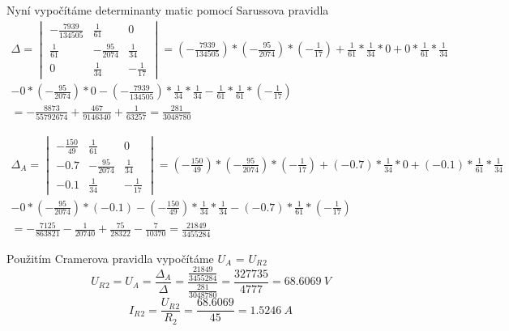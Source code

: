 Nyní vypočítáme determinanty matic pomocí Sarussova pravidla
\begin{multline*}
    \Delta =
    \begin{vmatrix}
        -\frac {7939} {134505}  & \frac {1} {61}        & 0 \\[6pt]
        \frac {1} {61}          & -\frac {95} {2074}    & \frac {1} {34} \\[6pt]
        0                       & \frac {1} {34}        & -\frac {1} {17}
    \end{vmatrix}
    = (-\frac {7939} {134505}) * (-\frac {95} {2074}) * (-\frac {1} {17}) 
    + \frac {1} {61} * \frac {1} {34} * 0
    + 0 * \frac {1} {61} * \frac {1} {34} \\
    - 0 * (-\frac {95} {2074}) * 0
    - (-\frac {7939} {134505}) * \frac {1} {34} * \frac {1} {34}
    - \frac {1} {61} * \frac {1} {61} * (-\frac {1} {17}) \\
    = -\frac {8873} {55792674} + \frac {467} {9146340} + \frac {1} {63257}
    = \frac {281} {3048780}
\end{multline*}

\begin{multline*}
    \Delta_A =
    \begin{vmatrix}
        -\frac {150} {49}       & \frac {1} {61}       & 0 \\[6pt]
        -0.7                    & -\frac {95} {2074}    & \frac {1} {34} \\[6pt]
        -0.1                    & \frac {1} {34}        & -\frac {1} {17}
    \end{vmatrix}
    = (-\frac {150} {49}) * (-\frac {95} {2074}) * (-\frac {1} {17}) 
    + (-0.7) * \frac {1} {34} * 0
    + (-0.1) * \frac {1} {61} * \frac {1} {34} \\
    - 0 * (-\frac {95} {2074}) * (-0.1)
    - (-\frac {150} {49}) * \frac {1} {34} * \frac {1} {34}
    - (-0.7) * \frac {1} {61} * (-\frac {1} {17}) \\
    = -\frac {7125} {863821} - \frac {1} {20740} + \frac {75} {28322} - \frac {7} {10370}
    = \frac {21849} {3455284}
\end{multline*}

Použitím Cramerova pravidla vypočítáme $U_A$ = $U_R{}_2$
\[ U_R{}_2 = U_A = \frac {\Delta_A} {\Delta} = \frac {\frac {21849} {3455284}} {\frac {281} {3048780}} = \frac {327735} {4777} = 68.6069 \ V \]
\[ I_R{}_2 = \frac {U_R{}_2} {R_2} = \frac {68.6069} {45} = 1.5246 \ A \]






